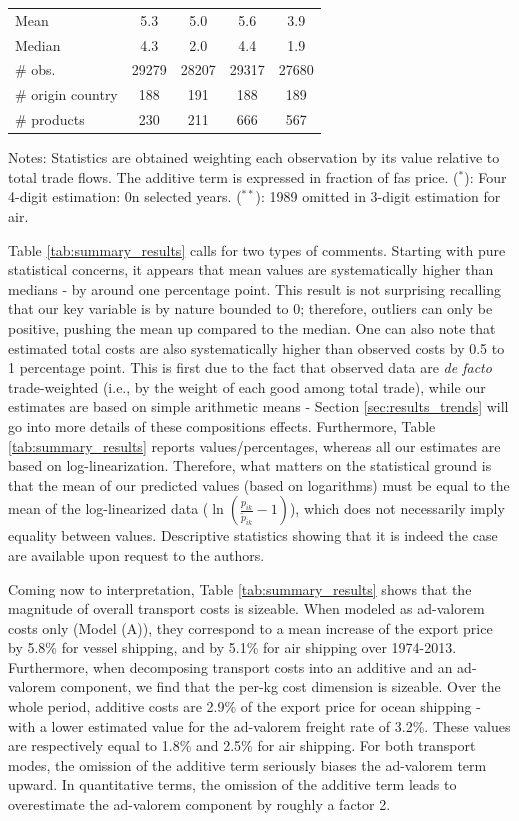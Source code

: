 \documentclass[a4paper,11pt]{article}
\begin{document}
\begin{table}[htbp]
{\begin{center}
\begin{tabular}{l|cc|cc}
        Mean & 5.3 & 5.0& 5.6&3.9 \\
        Median & 4.3 & 2.0 & 4.4& 1.9 \\ \hline
        \# obs. & 29279 & 28207 & 29317 & 27680 \\
    \# origin country & 188 & 191 & 188 & 189 \\
    \# products & 230 & 211 & 666 & 567 \\  \hline \hline
  \end{tabular}
    \end{center}}
\parbox[l]{10cm}{\tiny{Notes: Statistics are obtained weighting each observation by its value relative to total trade flows. The additive term is expressed in fraction of fas price. ($^\ast$): Four 4-digit estimation: 0n selected years. ($^{\ast \ast}$): 1989 omitted in 3-digit estimation for air.}}
\end{table}%


Table \ref{tab:summary_results} calls for two types of comments. Starting with pure statistical concerns, it appears that mean values are systematically higher than medians - by around one percentage point. This result is not surprising recalling that our key variable is by nature bounded to 0; therefore, outliers can only be positive, pushing the mean up compared to the median. One can also note that estimated total costs are also systematically higher than observed costs by 0.5 to 1 percentage point. This is first due to the fact that observed data are \emph{de facto} trade-weighted (i.e., by the weight of each good among total trade), while our estimates are based on simple arithmetic means - Section \ref{sec:results_trends} will go into more details of these compositions effects. Furthermore, Table \ref{tab:summary_results} reports values/percentages, whereas all our estimates are based on log-linearization. Therefore, what matters on the statistical ground is that the mean of our predicted values (based on logarithms) must be equal to the mean of the log-linearized data ($\ln\left(\frac{p_{ik}}{\widetilde{p}_{ik}}-1 \right)$), which does not necessarily imply equality between values. Descriptive statistics showing that it is indeed the case are available upon request to the authors.

Coming now to interpretation, Table \ref{tab:summary_results} shows that the magnitude of overall transport costs is sizeable. When modeled as ad-valorem costs only (Model (A)), they correspond to a mean increase of the export price by 5.8\% for vessel shipping, and by 5.1\% for air shipping over 1974-2013. Furthermore, when decomposing transport costs into an additive and an ad-valorem component, we find that the per-kg cost dimension is sizeable. Over the whole period, additive costs are 2.9\% of the export price for ocean shipping - with a lower estimated value for the ad-valorem freight rate of 3.2\%. These values are respectively equal to 1.8\% and 2.5\% for air shipping. For both transport modes, the omission of the additive term seriously biases the ad-valorem term upward. In quantitative terms, the omission of the additive term leads to overestimate the ad-valorem component by roughly a factor 2.
\end{document}
